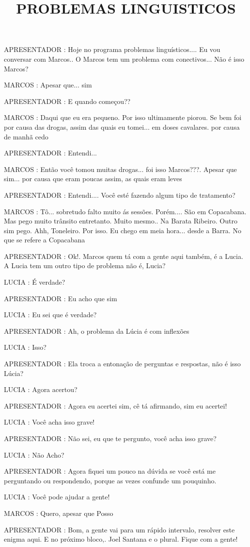 \documentclass[10pt]{article}
\author{}
\title{\vspace{-3.5cm}PROBLEMAS LINGUISTICOS}
\date{}
\newcommand{\mychar}[1]{
  \bigskip
  \hspace{-2em} \MakeUppercase{#1}
}
\begin{document}
\maketitle



\mychar{APRESENTADOR}: Hoje no programa problemas linguísticos.... Eu vou conversar com Marcos.. O Marcos tem um problema com conectivos... Não é isso Marcos?

\mychar{MARCOS}: Apesar que... sim

\mychar{APRESENTADOR}: E quando começou??

\mychar{MARCOS}: Daqui que eu era pequeno. Por isso ultimamente piorou. Se bem foi por causa das drogas, assim das quais eu tomei... em doses cavalares. por causa de manhã cedo

\mychar{APRESENTADOR}: Entendi...

\mychar{MARCOS}: Então você tomou muitas drogas... foi isso Marcos???. Apesar que sim... por causa que eram poucas assim, as quais eram leves

\mychar{APRESENTADOR}: Entendi.... Você esté fazendo algum tipo de tratamento?

\mychar{MARCOS}: Tô... sobretudo falto muito ás sessões. Porém.... São em Copacabana. Mas pego muito trânsito entretanto. Muito mesmo.. Na Barata Ribeiro. Outro sim pego. Ahh, Toneleiro. Por isso. Eu chego em meia hora... desde a Barra. No que se refere a Copacabana

\mychar{APRESENTADOR}: Ok!. Marcos quem tá com a gente aqui também, é a Lucia. A Lucia tem um outro tipo de problema não é, Lucia?

\mychar{LUCIA}: É verdade?

\mychar{APRESENTADOR}: Eu acho que sim

\mychar{LUCIA}: Eu sei que é verdade?

\mychar{APRESENTADOR}: Ah, o problema da Lúcia é com inflexões

\mychar{LUCIA}: Isso?

\mychar{APRESENTADOR}: Ela troca a entonação de perguntas e respostas, não é isso Lúcia?

\mychar{LUCIA}: Agora acertou?

\mychar{APRESENTADOR}: Agora eu acertei sim, cê tá afirmando, sim eu acertei!

\mychar{LUCIA}: Você acha isso grave!

\mychar{APRESENTADOR}: Não sei, eu que te pergunto, você acha isso grave?

\mychar{LUCIA}: Não Acho?

\mychar{APRESENTADOR}: Agora fiquei um pouco na dúvida se você está me perguntando ou respondendo, porque as vezes confunde um pouquinho.

\mychar{LUCIA}: Você pode ajudar a gente!

\mychar{MARCOS}: Quero, apesar que Posso

\mychar{APRESENTADOR}: Bom, a gente vai para um rápido intervalo, resolver este enigma aqui. E no próximo bloco,. Joel Santana e o plural. Fique com a gente!
\end{document}
